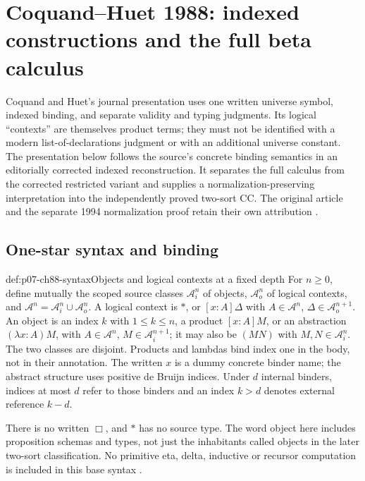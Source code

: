 \section{Coquand--Huet 1988: indexed constructions and the full beta calculus}
\label{sec:p07-ch88}

Coquand and Huet's journal presentation uses one written universe symbol,
indexed binding, and separate validity and typing judgments. Its logical
``contexts'' are themselves product terms; they must not be identified
with a modern list-of-declarations judgment or with an additional universe
constant. The presentation below follows the source's concrete binding
semantics in an editorially corrected indexed reconstruction. It separates
the full calculus from the corrected restricted variant and supplies a
normalization-preserving interpretation into the independently proved
two-sort CC. The original article and the separate 1994 normalization proof
retain their own attribution
\cite[\S\S1--3, pp.~95--105]{CoquandHuet1988}
\cite[\S\S2--3]{Geuvers1994Report9450}.

\subsection{One-star syntax and binding}

\begin{hbdefinition}{def:p07-ch88-syntax}{Objects and logical contexts at a fixed depth}
For \(n\geq0\), define mutually the scoped source classes
\(\mathcal A_i^n\) of objects, \(\mathcal A_o^n\) of logical contexts,
and \(\mathcal A^n=\mathcal A_i^n\cup\mathcal A_o^n\).
A logical context is \(\ast\), or \([x:A]\Delta\) with
\(A\in\mathcal A^n\), \(\Delta\in\mathcal A_o^{n+1}\).
An object is an index \(k\) with \(1\leq k\leq n\), a product
\([x:A]M\), or an abstraction \((\lambda x:A)M\), with
\(A\in\mathcal A^n\), \(M\in\mathcal A_i^{n+1}\); it may also
be \((MN)\) with \(M,N\in\mathcal A_i^n\). The two classes
are disjoint. Products and lambdas bind index one in the body, not in
their annotation. The written \(x\) is a dummy concrete binder name;
the abstract structure uses positive de Bruijn indices. Under \(d\)
internal binders, indices at most \(d\) refer to those binders and an
index \(k>d\) denotes external reference \(k-d\).

There is no written \(\Box\), and \(\ast\) has no source type.
The word object here includes proposition schemas and types, not just
the inhabitants called objects in the later two-sort classification.
No primitive eta, delta, inductive or recursor computation is included
in this base syntax \cite[pp.~95--98]{CoquandHuet1988}.
\end{hbdefinition}

